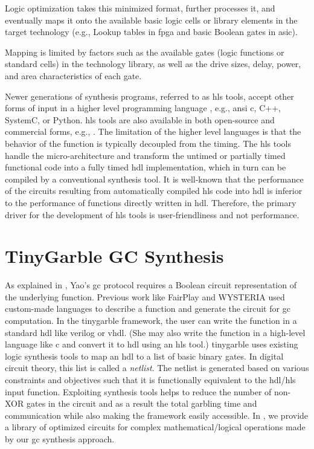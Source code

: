 Logic optimization takes this minimized format, further processes it, and eventually maps it onto the available basic logic cells or library elements in the target technology (e.g., Lookup tables in \acrshort{fpga} and basic Boolean gates in \acrshort{asic}).

Mapping is limited by factors such as the available gates (logic functions or standard cells) in the technology library, as well as the drive sizes, delay, power, and area characteristics of each gate.

Newer generations of synthesis programs, referred to as \acrfull{hls} tools, accept other forms of input in a higher level programming language \cite{Chapter:Zhang2008,chu1989hyper,corazao1996performance}, e.g., \acrshort{ansi} \gls{c}, C++, SystemC, or Python.
\acrshort{hls} tools are also available in both open-source and commercial forms, e.g., \cite{tool:Vivado,decaluwe2004myhdl,tool:PandA}.
The limitation of the higher level languages is that the behavior of the function is typically decoupled from the timing.
The \acrshort{hls} tools handle the micro-architecture and transform the untimed or partially timed functional code into a fully timed \acrshort{hdl} implementation, which in turn can be compiled by a conventional synthesis tool.
It is well-known that the performance of the circuits resulting from automatically compiled \acrshort{hls} code into \acrshort{hdl} is inferior to the performance of functions directly written in \acrshort{hdl}.
Therefore, the primary driver for the development of \acrshort{hls} tools is user-friendliness and not performance.

\section{TinyGarble GC Synthesis}\label{sec:syn-tiny}
As explained in , Yao's \acrshort{gc} protocol requires a Boolean circuit representation of the underlying function.
Previous work like FairPlay \cite{malkhi2004fairplay} and WYSTERIA \cite{rastogi2014wysteria} used custom-made languages to describe a function and generate the circuit for \acrshort{gc} computation.
In the \gls{tinygarble} framework, the user can write the function in a standard \acrshort{hdl} like \gls{verilog} or \gls{vhdl}.
(She may also write the function in a high-level language like \gls{c} and convert it to \acrshort{hdl} using an \acrshort{hls} tool.)
\gls{tinygarble} uses existing logic synthesis tools to map an \acrshort{hdl} to a list of basic binary gates.
In digital circuit theory, this list is called a \emph{\gls{netlist}}.
The \gls{netlist} is generated based on various constraints and objectives such that it is functionally equivalent to the \acrshort{hdl}/\acrshort{hls} input function.
Exploiting synthesis tools helps to reduce the number of non-XOR gates in the circuit and as a result the total garbling time and communication while also making the framework easily accessible.
In , we provide a library of optimized circuits for complex mathematical/logical operations made by our \acrshort{gc} synthesis approach.

